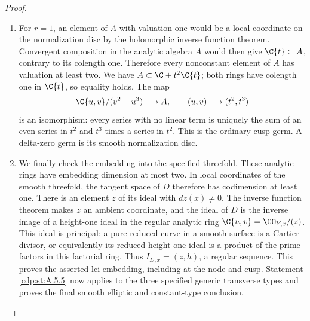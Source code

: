 \begin{proof}
\begin{enumerate}[label={$\langle1\rangle$\arabic*.},leftmargin=*]
\item For $r=1$, an element of $A$ with valuation one would
be a local coordinate on the normalization disc by
the holomorphic inverse function theorem. Convergent
composition in the analytic algebra $A$ would then
give $\C\{t\}\subset A$, contrary to its colength
one. Therefore every nonconstant element of $A$ has
valuation at least two. We have
$A\subset\C+t^2\C\{t\}$; both rings have
colength one in $\C\{t\}$, so equality holds.
The map
\[
 \C\{u,v\}/(v^2-u^3)\longrightarrow A,
                 \qquad (u,v)\longmapsto(t^2,t^3)
\]
is an isomorphism: every series with no linear term
is uniquely the sum of an even series in $t^2$ and
$t^3$ times a series in $t^2$. This is the ordinary
cusp germ. A delta-zero germ is its smooth
normalization disc.

\item We finally check the embedding into the specified
threefold. These analytic rings have embedding
dimension at most two. In local coordinates of the
smooth threefold, the tangent space of $D$ therefore
has codimension at least one. There is an element
$z$ of its ideal with $dz(x)\ne0$. The inverse
function theorem makes $z$ an ambient coordinate,
and the ideal of $D$ is the inverse image of a
height-one ideal in the regular analytic ring
$\C\{u,v\}=\OO_{Y,x}/(z)$. This ideal is principal:
a pure reduced curve in a smooth surface is a Cartier
divisor, or equivalently its reduced height-one ideal
is a product of the prime factors in this factorial
ring. Thus $I_{D,x}=(z,h)$, a regular sequence.
This proves the asserted lci embedding, including
at the node and cusp. Statement \ref{cdp:st:A.5.5} now applies
to the three specified generic transverse types
and proves the final smooth elliptic and constant-type
conclusion.

\end{enumerate}
\end{proof}
